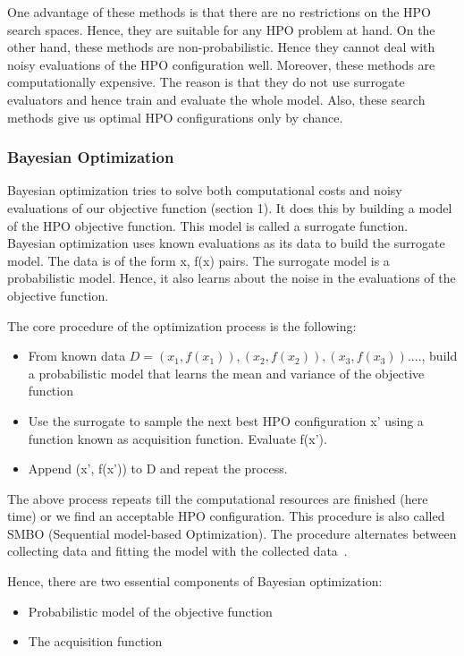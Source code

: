 \documentclass[11pt]{report}
\begin{document}
One advantage of these methods is that there are no restrictions on the HPO search spaces. Hence, they are suitable for any HPO problem at hand.
On the other hand, these methods are non-probabilistic.
Hence they cannot deal with noisy evaluations of the HPO configuration well.
Moreover, these methods are computationally expensive. The reason is that they do not use surrogate evaluators and hence train and evaluate the whole model.
Also, these search methods give us optimal HPO configurations only by chance.
\subsubsection{Bayesian Optimization}

Bayesian optimization tries to solve both computational costs and noisy evaluations of our objective function (section 1).
It does this by building a model of the HPO objective function. This model is called a surrogate function.
Bayesian optimization uses known evaluations as its data to build the surrogate model. The data is of the form {x, f(x)} pairs.
The surrogate model is a probabilistic model. Hence, it also learns about the noise in the evaluations of the objective function.

The core procedure of the optimization process is the following:
\begin{itemize}
\item From known data $D = {(x_1, f(x_1)), (x_2, f(x_2)), (x_3, f(x_3)) .... }$, build a probabilistic model that learns the mean and variance of the objective function
\item Use the surrogate to sample the next best HPO configuration x' using a function known as acquisition function. Evaluate f(x').
\item Append (x', f(x')) to D and repeat the process.
\end{itemize}

The above process repeats till the computational resources are finished (here time) or we find an acceptable HPO configuration.
This procedure is also called SMBO (Sequential model-based Optimization).
The procedure alternates between collecting data and fitting the model with the 
collected data~\cite{SMBOPaper}.

Hence, there are two essential components of Bayesian optimization:

\begin{itemize}
\item Probabilistic model of the objective function
\item The acquisition function
\end{itemize}
\end{document}

